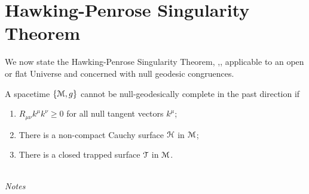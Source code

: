 \section{Hawking-Penrose Singularity Theorem}
\label{sec:Hawking}
We now state the Hawking-Penrose Singularity Theorem, \cite{Hawking:1973uf},\cite{Borde:1996pt}, applicable to an open or flat Universe and concerned with null geodesic congruences.
\begin{theorem}
\label{theorem:sing1}
A spacetime $\{{\cal M},g\}$ cannot be null-geodesically complete in the past direction if
\begin{enumerate}
\item $R_{\mu\nu}k^\mu k^\nu \geq 0$ for all null tangent vectors $k^\mu$;
\item There is a non-compact Cauchy surface ${\cal H}$ in ${\cal M}$;
\item There is a closed trapped surface ${\cal T}$ in ${\cal M}$.
\end{enumerate}
\end{theorem}
~\\\emph{Notes}
